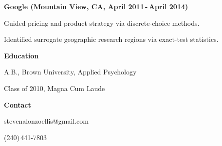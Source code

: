 \documentclass[12pt]{res}
\begin{document}
{\begin{resume}
\begin{minipage}{7.6in}
\begin{list}{}{\leftmargin=0em}
{\begin{list}{-}{\leftmargin=1em}
\item{\textbf{Google (Mountain View, CA, April  2011\,-\,April  2014)}  
\begin{list}{--}{\leftmargin=1em}
\item Guided pricing and product strategy via discrete-choice methods.
\item Identified surrogate geographic research regions via exact-test statistics.
\end{list}}
\end{list}}



\item{\textbf{Education}\dotfill 
\begin{list}{-}{\leftmargin=1em}
\item A.B., Brown University, Applied Psychology
\item Class of 2010, Magna Cum Laude
\end{list}}

\item{\textbf{Contact\hspace{1mm}}\dotfill 
\begin{list}{-}{\leftmargin=1em}
\item stevenalonzoellis@gmail.com
\item (240)\,441-7803
\end{list}}
\end{list}
\vspace{17mm}
\centering\fontsize{17pt}{30pt}\zapfinofont
{}
\vspace{12mm}
\end{minipage}
\end{resume}
} %
\end{document}

